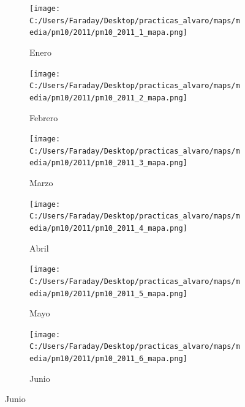 \documentclass[12pt]{article}
\begin{document}
\begin{figure}[H]
\centering
\begin{subfigure}[H]{0.15\textwidth}
\texttt{[image: C:/Users/Faraday/Desktop/practicas\_alvaro/maps/media/pm10/2011/pm10\_2011\_1\_mapa.png]}
\captionsetup{labelformat=empty}
\caption{Enero}
\label{fig:map-pm10-2011-1}
\end{subfigure}
%
\begin{subfigure}[H]{0.15\textwidth}
\texttt{[image: C:/Users/Faraday/Desktop/practicas\_alvaro/maps/media/pm10/2011/pm10\_2011\_2\_mapa.png]}
\captionsetup{labelformat=empty}
\caption{Febrero}
\label{fig:map-pm10-2011-2}
\end{subfigure}
%
\begin{subfigure}[H]{0.15\textwidth}
\texttt{[image: C:/Users/Faraday/Desktop/practicas\_alvaro/maps/media/pm10/2011/pm10\_2011\_3\_mapa.png]}
\captionsetup{labelformat=empty}
\caption{Marzo}
\label{fig:map-pm10-2011-3}
\end{subfigure}
%
\begin{subfigure}[H]{0.15\textwidth}
\texttt{[image: C:/Users/Faraday/Desktop/practicas\_alvaro/maps/media/pm10/2011/pm10\_2011\_4\_mapa.png]}
\captionsetup{labelformat=empty}
\caption{Abril}
\label{fig:map-pm10-2011-4}
\end{subfigure}
%
\begin{subfigure}[H]{0.15\textwidth}
\texttt{[image: C:/Users/Faraday/Desktop/practicas\_alvaro/maps/media/pm10/2011/pm10\_2011\_5\_mapa.png]}
\captionsetup{labelformat=empty}
\caption{Mayo}
\label{fig:map-pm10-2011-5}
\end{subfigure}
%
\begin{subfigure}[H]{0.15\textwidth}
\texttt{[image: C:/Users/Faraday/Desktop/practicas\_alvaro/maps/media/pm10/2011/pm10\_2011\_6\_mapa.png]}
\captionsetup{labelformat=empty}
\caption{Junio}
\label{fig:map-pm10-2011-6}
\end{subfigure}


\end{figure}
\end{document}
